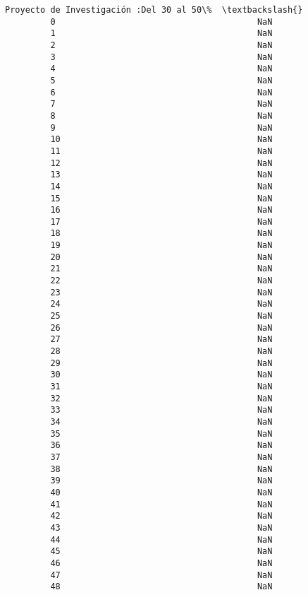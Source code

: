 \documentclass[11pt]{article}
\begin{document}
\begin{Verbatim}[commandchars=\\\{\}]
             Proyecto de Investigación :Del 30 al 50\%  \textbackslash{}
         0                                        NaN   
         1                                        NaN   
         2                                        NaN   
         3                                        NaN   
         4                                        NaN   
         5                                        NaN   
         6                                        NaN   
         7                                        NaN   
         8                                        NaN   
         9                                        NaN   
         10                                       NaN   
         11                                       NaN   
         12                                       NaN   
         13                                       NaN   
         14                                       NaN   
         15                                       NaN   
         16                                       NaN   
         17                                       NaN   
         18                                       NaN   
         19                                       NaN   
         20                                       NaN   
         21                                       NaN   
         22                                       NaN   
         23                                       NaN   
         24                                       NaN   
         25                                       NaN   
         26                                       NaN   
         27                                       NaN   
         28                                       NaN   
         29                                       NaN   
         30                                       NaN   
         31                                       NaN   
         32                                       NaN   
         33                                       NaN   
         34                                       NaN   
         35                                       NaN   
         36                                       NaN   
         37                                       NaN   
         38                                       NaN   
         39                                       NaN   
         40                                       NaN   
         41                                       NaN   
         42                                       NaN   
         43                                       NaN   
         44                                       NaN   
         45                                       NaN   
         46                                       NaN   
         47                                       NaN   
         48                                       NaN   
         

\end{Verbatim}
\end{document}
